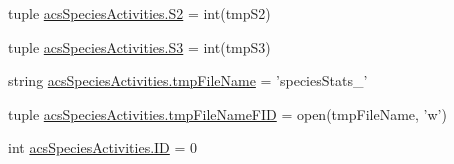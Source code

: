 \begin{DoxyCompactItemize}
\item 
tuple \hyperlink{a00103_a3b95f66d848ccbac2740be2878b2499b}{acs\-Species\-Activities.\-S2} = int(tmp\-S2)
\item 
tuple \hyperlink{a00103_a654d2a657cf4b354b3791a8b2de3d74e}{acs\-Species\-Activities.\-S3} = int(tmp\-S3)
\item 
string \hyperlink{a00103_a23844a8104156ee329f8c957f11490f4}{acs\-Species\-Activities.\-tmp\-File\-Name} = 'species\-Stats\-\_\-'
\item 
tuple \hyperlink{a00103_addb867cf8533f2e18682c49f08f47bba}{acs\-Species\-Activities.\-tmp\-File\-Name\-F\-I\-D} = open(tmp\-File\-Name, 'w')
\item 
int \hyperlink{a00103_a8102909ea2c113190493bd581f17ba18}{acs\-Species\-Activities.\-I\-D} = 0
\end{DoxyCompactItemize}
